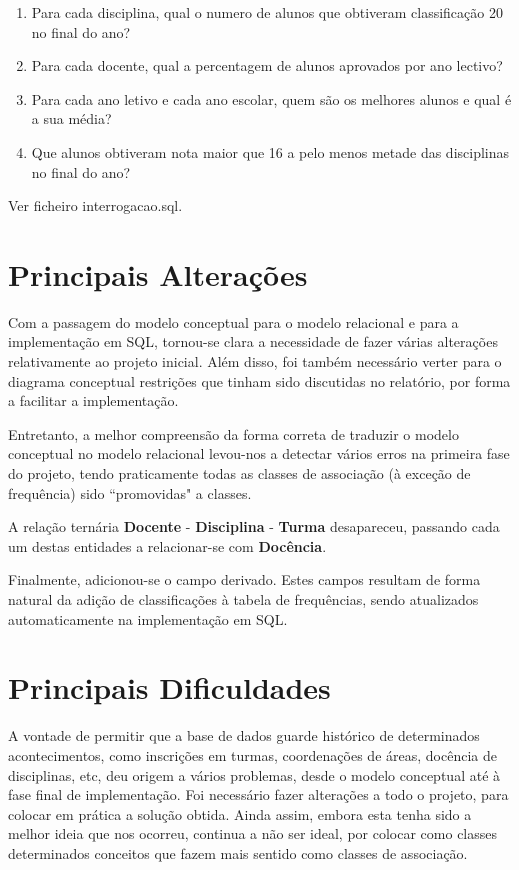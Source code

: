 \documentclass[12pt,a4paper,reqno]{report}
\numberwithin{figure}{section}
\numberwithin{equation}{section}
\begin{document}
\begin{enumerate}
	\item Para cada disciplina, qual o numero de alunos que obtiveram classificação 20 no final do ano?
	
	\item Para cada docente, qual a percentagem de alunos aprovados por ano lectivo?
		
	\item Para cada ano letivo e cada ano escolar, quem são os melhores alunos e qual é a sua média?
	
	\item Que alunos obtiveram nota maior que 16 a pelo menos metade das disciplinas no final do ano?
	
\end{enumerate}

Ver ficheiro interrogacao.sql.

\chapter{Principais Alterações}

Com a passagem do modelo conceptual para o modelo relacional e para a implementação em SQL, tornou-se clara a necessidade de fazer várias alterações relativamente ao projeto inicial. Além disso, foi também necessário verter para o diagrama conceptual restrições que tinham sido discutidas no relatório, por forma a facilitar a implementação.

Entretanto, a melhor compreensão da forma correta de traduzir o modelo conceptual no modelo relacional levou-nos a detectar vários erros na primeira fase do projeto, tendo praticamente todas as classes de associação (à exceção de frequência) sido ``promovidas" a classes. 

A relação ternária \textbf{Docente} - \textbf{Disciplina} - \textbf{Turma} desapareceu, passando cada um destas entidades a relacionar-se com \textbf{Docência}.

Finalmente, adicionou-se o campo derivado. Estes campos resultam de forma natural da adição de classificações à tabela de frequências, sendo atualizados automaticamente na implementação em SQL.

\chapter{Principais Dificuldades}

A vontade de permitir que a base de dados guarde histórico de determinados acontecimentos, como inscrições em turmas, coordenações de áreas, docência de disciplinas, etc, deu origem a vários problemas, desde o modelo conceptual até à fase final de implementação. Foi necessário fazer alterações a todo o projeto, para colocar em prática a solução obtida. Ainda assim, embora esta tenha sido a melhor ideia que nos ocorreu, continua a não ser ideal, por colocar como classes determinados conceitos que fazem mais sentido como classes de associação.
\end{document}
